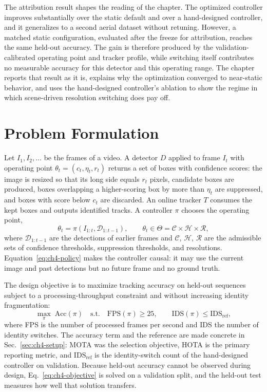 The attribution result shapes the reading of the chapter. The optimized controller improves substantially over the static default and over a hand-designed controller, and it generalizes to a second aerial dataset without retuning. However, a matched static configuration, evaluated after the freeze for attribution, reaches the same held-out accuracy. The gain is therefore produced by the validation-calibrated operating point and tracker profile, while switching itself contributes no measurable accuracy for this detector and this operating range. The chapter reports that result as it is, explains why the optimization converged to near-static behavior, and uses the hand-designed controller's ablation to show the regime in which scene-driven resolution switching does pay off.

\section{Problem Formulation}\label{sec:ch4-problem}
Let $I_1, I_2, \ldots$ be the frames of a video. A detector $D$ applied to frame $I_t$ with operating point $\theta_t=(c_t,\eta_t,r_t)$ returns a set of boxes with confidence scores: the image is resized so that its long side equals $r_t$ pixels, candidate boxes are produced, boxes overlapping a higher-scoring box by more than $\eta_t$ are suppressed, and boxes with score below $c_t$ are discarded. An online tracker $T$ consumes the kept boxes and outputs identified tracks. A controller $\pi$ chooses the operating point,
\begin{equation}
\theta_t = \pi\left(I_{1:t}, \mathcal{D}_{1:t-1}\right), \qquad \theta_t \in \Theta = \mathcal{C} \times \mathcal{H} \times \mathcal{R},
\label{eq:ch4-policy}
\end{equation}
where $\mathcal{D}_{1:t-1}$ are the detections of earlier frames and $\mathcal{C}$, $\mathcal{H}$, $\mathcal{R}$ are the admissible sets of confidence thresholds, suppression thresholds, and resolutions. Equation~\eqref{eq:ch4-policy} makes the controller causal: it may use the current image and past detections but no future frame and no ground truth.

The design objective is to maximize tracking accuracy on held-out sequences subject to a processing-throughput constraint and without increasing identity fragmentation:
\begin{equation}
\max_{\pi}\; \mathrm{Acc}(\pi) \quad \text{s.t.} \quad \mathrm{FPS}(\pi) \ge 25, \qquad \mathrm{IDS}(\pi) \le \mathrm{IDS}_{\mathrm{ref}},
\label{eq:ch4-objective}
\end{equation}
where FPS is the number of processed frames per second and IDS the number of identity switches. The accuracy term and the reference are made concrete in Sec.~\ref{sec:ch4-setup}: MOTA was the selection objective, HOTA is the primary reporting metric, and $\mathrm{IDS}_{\mathrm{ref}}$ is the identity-switch count of the hand-designed controller on validation. Because held-out accuracy cannot be observed during design, Eq.~\eqref{eq:ch4-objective} is solved on a validation split, and the held-out test measures how well that solution transfers.

